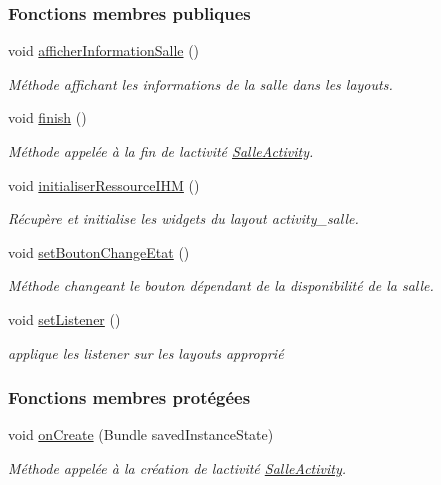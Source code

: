 \subsubsection*{Fonctions membres publiques}
\begin{DoxyCompactItemize}
\item 
void \hyperlink{classcom_1_1lasalle_1_1meeting_1_1_salle_activity_aee6f0cd7a9029d5fbe12bf85c2316f82}{afficher\+Information\+Salle} ()
\begin{DoxyCompactList}\small\item\em Méthode affichant les informations de la salle dans les layouts. \end{DoxyCompactList}\item 
void \hyperlink{classcom_1_1lasalle_1_1meeting_1_1_salle_activity_a26628d1f78ddcfaff36b33d354cd97b9}{finish} ()
\begin{DoxyCompactList}\small\item\em Méthode appelée à la fin de l\textquotesingle{}activité \hyperlink{classcom_1_1lasalle_1_1meeting_1_1_salle_activity}{Salle\+Activity}. \end{DoxyCompactList}\item 
void \hyperlink{classcom_1_1lasalle_1_1meeting_1_1_salle_activity_af41d9cf11c5032e1c44b7e8f08b8211a}{initialiser\+Ressource\+I\+HM} ()
\begin{DoxyCompactList}\small\item\em Récupère et initialise les widgets du layout activity\+\_\+salle. \end{DoxyCompactList}\item 
void \hyperlink{classcom_1_1lasalle_1_1meeting_1_1_salle_activity_a6b2086a70d8c1dc9841663029793ff00}{set\+Bouton\+Change\+Etat} ()
\begin{DoxyCompactList}\small\item\em Méthode changeant le bouton dépendant de la disponibilité de la salle. \end{DoxyCompactList}\item 
void \hyperlink{classcom_1_1lasalle_1_1meeting_1_1_salle_activity_a6d9b28a6a25b91ea9632ec4105dd33cf}{set\+Listener} ()
\begin{DoxyCompactList}\small\item\em applique les listener sur les layouts approprié \end{DoxyCompactList}\end{DoxyCompactItemize}
\subsubsection*{Fonctions membres protégées}
\begin{DoxyCompactItemize}
\item 
void \hyperlink{classcom_1_1lasalle_1_1meeting_1_1_salle_activity_a42079164af7344cb01a22eab03d2022f}{on\+Create} (Bundle saved\+Instance\+State)
\begin{DoxyCompactList}\small\item\em Méthode appelée à la création de l\textquotesingle{}activité \hyperlink{classcom_1_1lasalle_1_1meeting_1_1_salle_activity}{Salle\+Activity}. \end{DoxyCompactList}\end{DoxyCompactItemize}
